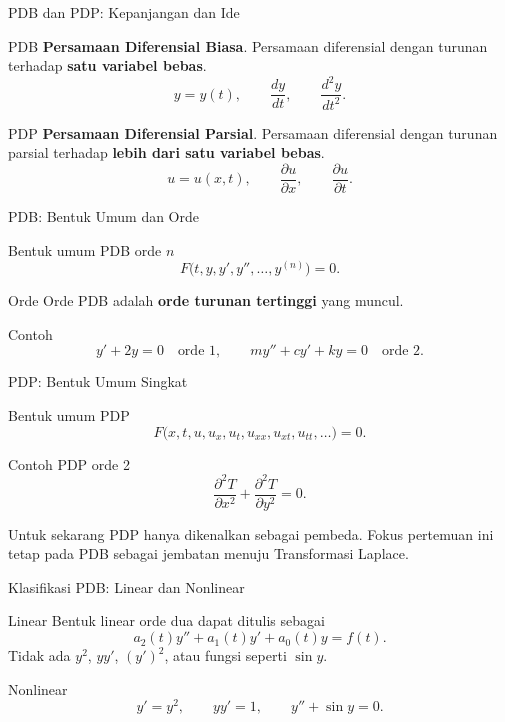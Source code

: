 \documentclass[aspectratio=169,11pt]{beamer}
\begin{document}
\begin{frame}{PDB dan PDP: Kepanjangan dan Ide}
\begin{block}{PDB}
\textbf{Persamaan Diferensial Biasa}. Persamaan diferensial dengan turunan terhadap \textbf{satu variabel bebas}.
\[
y=y(t),\qquad \frac{dy}{dt},\qquad \frac{d^2y}{dt^2}.
\]
\end{block}
\begin{block}{PDP}
\textbf{Persamaan Diferensial Parsial}. Persamaan diferensial dengan turunan parsial terhadap \textbf{lebih dari satu variabel bebas}.
\[
u=u(x,t),\qquad \frac{\partial u}{\partial x},\qquad \frac{\partial u}{\partial t}.
\]
\end{block}
\end{frame}

\begin{frame}{PDB: Bentuk Umum dan Orde}
\begin{block}{Bentuk umum PDB orde $n$}
\[
F\bigl(t,y,y',y'',\ldots,y^{(n)}\bigr)=0.
\]
\end{block}
\begin{block}{Orde}
Orde PDB adalah \textbf{orde turunan tertinggi} yang muncul.
\end{block}
\begin{exampleblock}{Contoh}
\[
y'+2y=0 \quad \text{orde 1},
\qquad
my''+cy'+ky=0 \quad \text{orde 2}.
\]
\end{exampleblock}
\end{frame}

\begin{frame}{PDP: Bentuk Umum Singkat}
\begin{block}{Bentuk umum PDP}
\[
F\bigl(x,t,u,u_x,u_t,u_{xx},u_{xt},u_{tt},\ldots\bigr)=0.
\]
\end{block}
\begin{exampleblock}{Contoh PDP orde 2}
\[
\frac{\partial^2 T}{\partial x^2}+\frac{\partial^2 T}{\partial y^2}=0.
\]
\end{exampleblock}
\begin{alertblock}{Untuk sekarang}
PDP hanya dikenalkan sebagai pembeda. Fokus pertemuan ini tetap pada PDB sebagai jembatan menuju Transformasi Laplace.
\end{alertblock}
\end{frame}

\begin{frame}{Klasifikasi PDB: Linear dan Nonlinear}
\begin{block}{Linear}
Bentuk linear orde dua dapat ditulis sebagai
\[
a_2(t)y''+a_1(t)y'+a_0(t)y=f(t).
\]
Tidak ada $y^2$, $yy'$, $(y')^2$, atau fungsi seperti $\sin y$.
\end{block}
\begin{block}{Nonlinear}
\[
y'=y^2,
\qquad yy'=1,
\qquad y''+\sin y=0.
\]
\end{block}
\end{frame}
\end{document}
